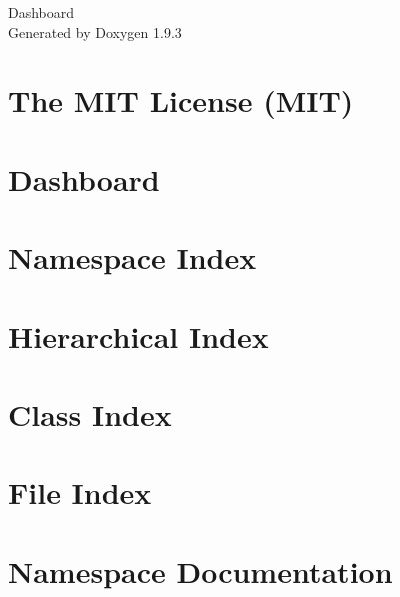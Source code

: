 \documentclass[twoside]{book}
\newcommand{\+}{\discretionary{\mbox{\scriptsize$\hookleftarrow$}}{}{}}
\newcommand{\clearemptydoublepage}{%
    \newpage{\pagestyle{empty}\cleardoublepage}%
  }
\begin{document}
  \raggedbottom
    \hypersetup{pageanchor=false,
                bookmarksnumbered=true,
                pdfencoding=unicode
               }
  \begin{titlepage}
  \vspace*{7cm}
  \begin{center}%
  {\Large Dashboard}\\
  \vspace*{1cm}
  {\large Generated by Doxygen 1.9.3}\\
  \end{center}
  \end{titlepage}
  \clearemptydoublepage
  \tableofcontents
  \clearemptydoublepage
  \hypersetup{pageanchor=true}
\chapter{The MIT License (MIT)}
\label{md_Dashboard_wwwroot_lib_jquery_validation_LICENSE}

\chapter{Dashboard}
\label{md_README}

\chapter{Namespace Index}

\chapter{Hierarchical Index}

\chapter{Class Index}

\chapter{File Index}

\chapter{Namespace Documentation}













\end{document}
